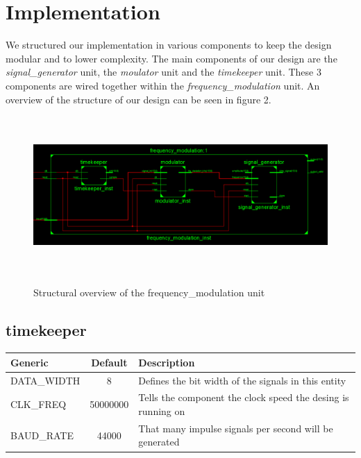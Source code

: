 \section{Implementation}

We structured our implementation in various components to keep the design modular and to lower complexity.
The main components of our design are the \textit{signal\_generator} unit, the \textit{moulator} unit and the
\textit{timekeeper} unit. These 3 components are wired together within the \textit{frequency\_modulation} unit.
An overview of the structure of our design can be seen in figure 2.

\begin{landscape}
	\begin{figure}[H] 
	    \scalebox{1.2} %
		{\includegraphics[height=6cm]{images/structure.png}} %
		\caption{Structural overview of the frequency\_modulation unit} 
		\label{fig:lorem} %
	\end{figure} 
\end{landscape}

\subsection{timekeeper}

\begin{adjustwidth}{-0.8cm}{}
	\begin{center}
		\begin{tabular}{ | l | c | l | }
			\hline
			\textbf{Generic} & \textbf{Default} & \textbf{Description} \\
			\hline
			DATA\_WIDTH & 8 & Defines the bit width of the signals in this entity \\
			CLK\_FREQ & 50000000 & Tells the component the clock speed the desing is running on \\
			BAUD\_RATE & 44000 & That many impulse signals per second will be generated \\
			\hline
		\end{tabular} 
	\end{center}
\end{adjustwidth}

